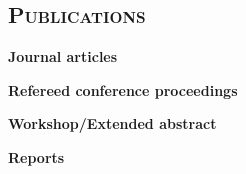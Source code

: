 \documentclass[margin,10pt]{res} %
\begin{document}
\begin{resume}
\section{\textnormal{\textsc{Publications}}} 
\noindent\textbf{Journal articles}\\
\begin{etaremune}

\end{etaremune}
\clearpage
\noindent\textbf{Refereed conference proceedings}\\
\begin{etaremune}

\end{etaremune}
\noindent\textbf{Workshop/Extended abstract}\\
\begin{etaremune}

\end{etaremune}
\noindent\textbf{Reports}\\
\begin{etaremune}

\end{etaremune}

\end{resume}
\end{document}
